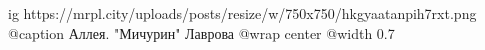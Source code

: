  
 
 
 
 

\ifcmt
  ig https://mrpl.city/uploads/posts/resize/w/750x750/hkgyaatanpih7rxt.png
  @caption Аллея. "Мичурин" Лаврова
  @wrap center
  @width 0.7
\fi
